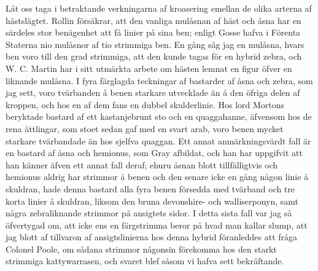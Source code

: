 Låt oss taga i betraktande verkningarna af kroasering emellan de olika arterna af hästslägtet. Rollin försäkrar, att den vanliga mulåsnan af häst och åsna har en särdeles stor benägenhet att få linier på sina ben; enligt Gosse hafva i Förenta Staterna nio mulåsnor af tio strimmiga ben. En gång såg jag en mulåsna, hvars ben voro till den grad strimmiga, att den kunde tagas för en hybrid zebra, och W. C. Martin har i sitt utmärkta arbete om hästen lemnat en figur öfver en liknande mulåsna. I fyra färglagda teckningar af bastarder af åsna och zebra, som jag sett, voro tvärbanden å benen starkare utvecklade än å den öfriga delen af kroppen, och hos en af dem fans en dubbel skulderlinie. Hos lord Mortons beryktade bastard af ett kastanjebrunt sto och en quaggahanne, äfvensom hos de rena ättlingar, som stoet sedan gaf med en svart arab, voro benen mycket starkare tvärbandade än hos sjelfva quaggan. Ett annat anmärkningsvärdt fall är en bastard af åsna och hemionus, som Gray afbildat, och han har uppgifvit att han känner äfven ett annat fall deraf; ehuru åsnan blott tillfälligtvis och hemionus aldrig har strimmor å benen och den senare icke en gång någon linie å skuldran, hade denna bastard alla fyra benen försedda med tvärband och tre korta linier å skuldran, liksom den bruna devonshire- och walliserponyn, samt några zebraliknande strimmor på ansigtets sidor. I detta sista fall var jag så öfvertygad om, att icke ens en färgstrimma beror på hvad man kallar slump, att jag blott af tillvaron af ansigtslinierna hos denna hybrid föranleddes att fråga Colonel Poole, om sådana strimmor någonsin förekomma hos den starkt strimmiga kattywarrasen, och svaret blef såsom vi hafva sett bekräftande.

